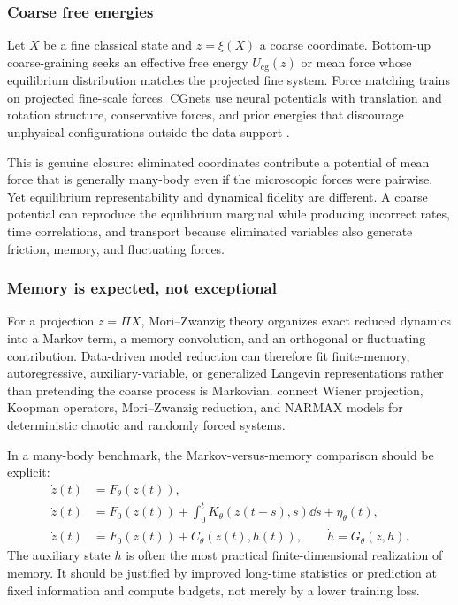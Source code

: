 \subsubsection{Coarse free energies}

Let \(X\) be a fine classical state and \(z=\xi(X)\) a coarse coordinate. Bottom-up coarse-graining seeks an effective free energy \(U_{\mathrm{cg}}(z)\) or mean force whose equilibrium distribution matches the projected fine system. Force matching trains on projected fine-scale forces. CGnets use neural potentials with translation and rotation structure, conservative forces, and prior energies that discourage unphysical configurations outside the data support \citep{wang2019cgnet}.

This is genuine closure: eliminated coordinates contribute a potential of mean force that is generally many-body even if the microscopic forces were pairwise. Yet equilibrium representability and dynamical fidelity are different. A coarse potential can reproduce the equilibrium marginal while producing incorrect rates, time correlations, and transport because eliminated variables also generate friction, memory, and fluctuating forces.

\subsubsection{Memory is expected, not exceptional}

For a projection \(z=\Pi X\), Mori--Zwanzig theory organizes exact reduced dynamics into a Markov term, a memory convolution, and an orthogonal or fluctuating contribution. Data-driven model reduction can therefore fit finite-memory, autoregressive, auxiliary-variable, or generalized Langevin representations rather than pretending the coarse process is Markovian. \citet{lin2021kmz} connect Wiener projection, Koopman operators, Mori--Zwanzig reduction, and NARMAX models for deterministic chaotic and randomly forced systems.

In a many-body benchmark, the Markov-versus-memory comparison should be explicit:
\begin{align}
\dot z(t)
&=
F_\theta(z(t)),
\\
\dot z(t)
&=
F_0(z(t))
+\int_0^t K_\theta(z(t-s),s)\dd s
+\eta_\theta(t),
\\
\dot z(t)
&=
F_0(z(t))+C_\theta(z(t),h(t)),
\qquad
\dot h=G_\theta(z,h).
\end{align}
The auxiliary state \(h\) is often the most practical finite-dimensional realization of memory. It should be justified by improved long-time statistics or prediction at fixed information and compute budgets, not merely by a lower training loss.

